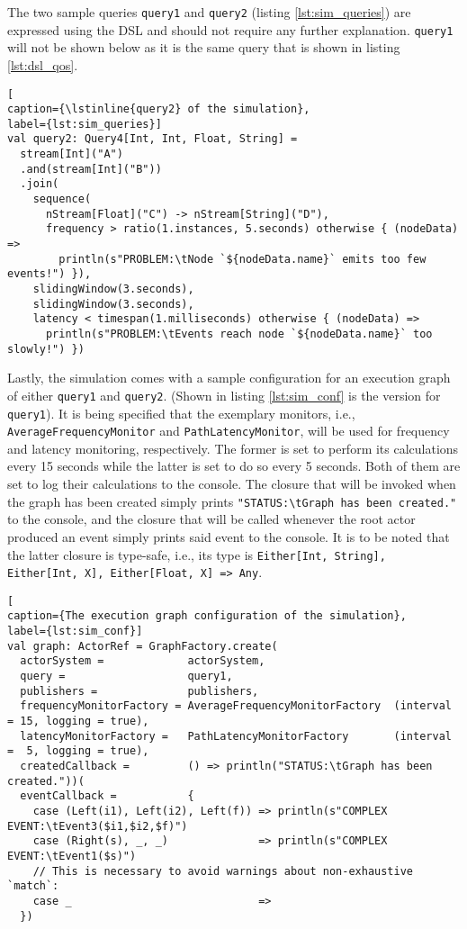 \documentclass[article, type=bsc, colorback, accentcolor=tud8b, parskip=half, bibliography=totocnumbered]{tudthesis}
\begin{document}
The two sample queries \lstinline{query1} and \lstinline{query2} (listing \ref{lst:sim_queries}) are expressed using the DSL and should not require any further explanation.
\lstinline{query1} will not be shown below as it is the same query that is shown in listing \ref{lst:dsl_qos}.

\begin{lstlisting}[
caption={\lstinline{query2} of the simulation},
label={lst:sim_queries}]
val query2: Query4[Int, Int, Float, String] =
  stream[Int]("A")
  .and(stream[Int]("B"))
  .join(
    sequence(
      nStream[Float]("C") -> nStream[String]("D"),
      frequency > ratio(1.instances, 5.seconds) otherwise { (nodeData) =>
        println(s"PROBLEM:\tNode `${nodeData.name}` emits too few events!") }),
    slidingWindow(3.seconds),
    slidingWindow(3.seconds),
    latency < timespan(1.milliseconds) otherwise { (nodeData) =>
      println(s"PROBLEM:\tEvents reach node `${nodeData.name}` too slowly!") })
\end{lstlisting}

Lastly, the simulation comes with a sample configuration for an execution graph of either \lstinline{query1} and \lstinline{query2}.
(Shown in listing \ref{lst:sim_conf} is the version for \lstinline{query1}).
It is being specified that the exemplary monitors, i.e., \lstinline{AverageFrequencyMonitor} and \lstinline{PathLatencyMonitor}, will be used for frequency and latency monitoring, respectively.
The former is set to perform its calculations every 15 seconds while the latter is set to do so every 5 seconds.
Both of them are set to log their calculations to the console.
The closure that will be invoked when the graph has been created simply prints \lstinline{"STATUS:\tGraph has been created."} to the console, and the closure that will be called whenever the root actor produced an event simply prints said event to the console.
It is to be noted that the latter closure is type-safe, i.e., its type is \lstinline{Either[Int, String], Either[Int, X], Either[Float, X] => Any}.

\begin{lstlisting}[
caption={The execution graph configuration of the simulation},
label={lst:sim_conf}]
val graph: ActorRef = GraphFactory.create(
  actorSystem =             actorSystem,
  query =                   query1,
  publishers =              publishers,
  frequencyMonitorFactory = AverageFrequencyMonitorFactory  (interval = 15, logging = true),
  latencyMonitorFactory =   PathLatencyMonitorFactory       (interval =  5, logging = true),
  createdCallback =         () => println("STATUS:\tGraph has been created."))(
  eventCallback =           {
    case (Left(i1), Left(i2), Left(f)) => println(s"COMPLEX EVENT:\tEvent3($i1,$i2,$f)")
    case (Right(s), _, _)              => println(s"COMPLEX EVENT:\tEvent1($s)")
    // This is necessary to avoid warnings about non-exhaustive `match`:
    case _                             =>
  })
\end{lstlisting}
\end{document}
